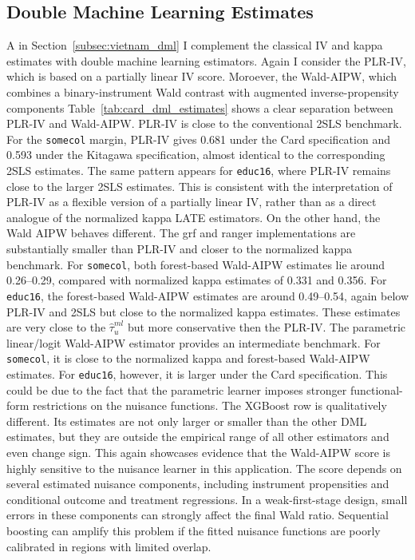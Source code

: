\documentclass[12pt, a4paper, oneside]{article}
\theoremstyle{plain}
\theoremstyle{definition}
\begin{document}
\subsection{Double Machine Learning Estimates}
\label{subsec:card_dml_estimates}
A in Section~\ref{subsec:vietnam_dml}
I complement the classical IV and kappa estimates with double machine learning estimators.
Again I consider the PLR-IV, which is based on a partially linear IV score. Moroever, the Wald-AIPW, which combines a binary-instrument Wald contrast with augmented inverse-propensity components
Table~\ref{tab:card_dml_estimates} shows a clear separation between PLR-IV and Wald-AIPW. PLR-IV is close to the conventional 2SLS benchmark. For the \texttt{somecol} margin, PLR-IV gives 0.681 under the Card specification and 0.593 under the Kitagawa specification, almost identical to the corresponding 2SLS estimates.
The same pattern appears for \texttt{educ16}, where PLR-IV remains close to the larger 2SLS estimates. This is consistent with the interpretation of PLR-IV as a flexible version of a partially linear IV, rather than as a direct analogue of the normalized kappa LATE estimators.
On the other hand, the Wald AIPW behaves different. 
The grf and ranger implementations are substantially smaller than PLR-IV and closer to the normalized kappa benchmark. For \texttt{somecol}, both forest-based Wald-AIPW estimates lie around 0.26--0.29, compared with normalized kappa estimates of 0.331 and 0.356. For \texttt{educ16}, the forest-based Wald-AIPW estimates are around 0.49--0.54, again below PLR-IV and 2SLS but close to the normalized kappa estimates.
These estimates are very close to the $\hat{\tau}^{ml}_{u}$ but more conservative then the PLR-IV.
The parametric linear/logit Wald-AIPW estimator provides an intermediate benchmark. For \texttt{somecol}, it is close to the normalized kappa and forest-based Wald-AIPW estimates. For \texttt{educ16}, however, it is larger under the Card specification.
This could be due to the fact that the parametric learner imposes stronger functional-form restrictions on the nuisance functions. 
The XGBoost row is qualitatively different. Its estimates are not only larger or smaller than the other DML estimates, but they are outside the empirical range of all other estimators and even change sign.
This again showcases evidence that the Wald-AIPW score is highly sensitive to the nuisance learner in this application.
The score depends on several estimated nuisance components, including instrument propensities and conditional outcome and treatment regressions. In a weak-first-stage design, small errors in these components can strongly affect the final Wald ratio.
Sequential boosting can amplify this problem if the fitted nuisance functions are poorly calibrated in regions with limited overlap.
\end{document}
